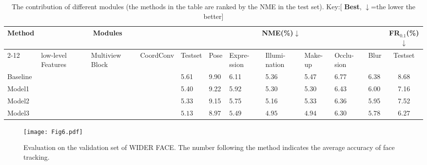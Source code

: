 \documentclass[3p,twocolumn, round, sort & compress]{elsarticle}
\begin{document}
\begin{table*}[t!]
	\centering
	\begin{tabular}{m{1.05cm}<{\centering}|m{1.4cm}<{\centering}m{1.1cm}<{\centering}m{1.4cm}<{\centering}|m{0.6cm}<{\centering}m{0.6cm}<{\centering}m{0.6cm}<{\centering}m{0.6cm}<{\centering}m{0.6cm}<{\centering}m{0.6cm}<{\centering}m{0.6cm}<{\centering}|c}
		\hline
		\multirow{3}{*}{Method} & \multicolumn{3}{c|}{Modules} & \multicolumn{7}{c|}{NME(\%)$\downarrow$} & FR$_{0.1}$(\%)$\downarrow$ \\ \cline{2-12} 
		& low-level Features & Multiview Block & CoordConv & Testset & Pose & Expre-ssion & Illumi-nation & Make-up & Occlu-sion & Blur & Testset \\ \hline
		Baseline & & &  & 5.61    & 9.90 & 6.11       & 5.36         & 5.47    & 6.77      & 6.38 & 8.68       \\
		Model1                  &    \checkmark          &                 &           & 5.40    & 9.22 & 5.92       & 5.30         & 5.30    & 6.43      & 6.00 & 7.16       \\
		Model2                  &     \checkmark        &   \checkmark      &           & 5.33    & 9.15 & 5.75       & 5.16         & 5.33    & 6.36      & 5.95 & 7.52       \\
		Model3                  &    \checkmark      &   \checkmark  & \checkmark  & {\color{red} \textbf{$\bm{5.13}$}}    & {\color{red} \textbf{$\bm{8.97}$}} & {\color{red} \textbf{$\bm{5.49}$}} & {\color{red} \textbf{$\bm{4.95}$}} & {\color{red} \textbf{$\bm{4.94}$}}    & {\color{red} \textbf{$\bm{6.30}$}} & {\color{red} \textbf{$\bm{5.78}$}} & {\color{red} \textbf{$\bm{6.27}$}}    \\ \hline
	\end{tabular}
	\caption{The contribution of different modules (the methods in the table are ranked by the NME in the test set). Key:[{\color{red} \textbf{Best}}, $\downarrow$=the lower the better]}
	\label{Tabal7}
\end{table*}


\begin{figure}[t!]
	\centering
	\texttt{[image: Fig6.pdf]}
	\caption{Evaluation on the validation set of WIDER FACE. The number following the method indicates the average accuracy of face tracking.}
	\label{fig6}
\end{figure}
\end{document}
